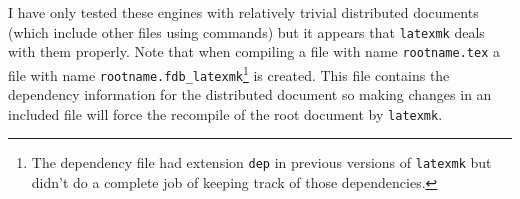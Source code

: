 \documentclass[11pt]{article}
\begin{document}
I have only tested these engines with relatively trivial distributed documents (which include other files using \verb|| commands) but it appears that \texttt{latexmk} deals with them properly. Note that when compiling a file with name \texttt{rootname.tex} a file with name \texttt{rootname.fdb\_latexmk}\footnote{The dependency file had extension \texttt{dep} in previous versions of \texttt{latexmk} but didn't do a complete job of keeping track of those dependencies.} is created. This file contains the dependency information for the distributed document so making changes in an included file will force the recompile of the root document by \texttt{latexmk}.

%
%
\end{document}
